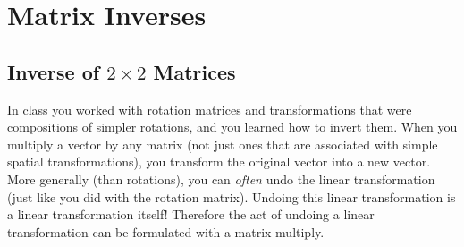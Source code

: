 %
%
%
%
%
%
%


%

\section{Matrix Inverses}

\subsection{Inverse of $2\times 2$ Matrices}

In class you worked with rotation matrices and transformations that were compositions of simpler rotations, and you learned how to invert them. When you multiply a vector by any matrix (not just ones that are associated with simple spatial transformations), you transform the original vector into a new vector. More generally (than rotations), you can \emph{often} undo the linear transformation (just like you did with the rotation matrix). Undoing this linear transformation is a linear transformation itself! Therefore the act of undoing a linear transformation can be formulated with a matrix multiply.

